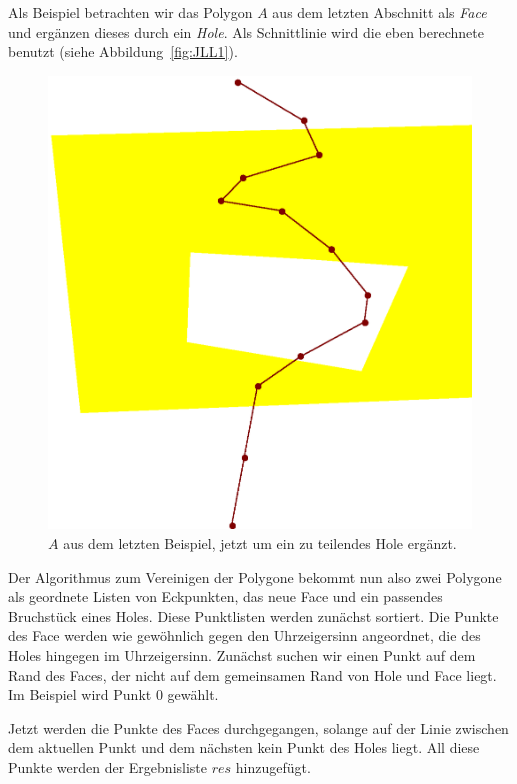 Als Beispiel betrachten wir das Polygon $A$ aus dem letzten Abschnitt als \textit{Face} und ergänzen dieses durch ein \textit{Hole}. Als Schnittlinie wird die eben berechnete benutzt (siehe Abbildung~\vref{fig:JLL1}).

\begin{figure}
	\centering
	\includegraphics[scale=0.6]{JLL1.svg.eps}
	\caption[Ein Face mit einem Hole wird geteilt]{$A$ aus dem letzten Beispiel, jetzt um ein zu teilendes Hole ergänzt.}
	\label{fig:JLL1}
\end{figure}

Der Algorithmus zum Vereinigen der Polygone bekommt nun also zwei Polygone als geordnete Listen von Eckpunkten, das neue Face und ein passendes Bruchstück eines Holes. Diese Punktlisten werden zunächst sortiert. Die Punkte des Face werden wie gewöhnlich gegen den Uhrzeigersinn  angeordnet, die des Holes hingegen im Uhrzeigersinn. Zunächst suchen wir einen Punkt auf dem Rand des Faces, der nicht auf dem gemeinsamen Rand von Hole und Face liegt. Im Beispiel wird Punkt 0 gewählt.

Jetzt werden die Punkte des Faces durchgegangen, solange auf der Linie zwischen dem aktuellen Punkt und dem nächsten kein Punkt des Holes liegt. All diese Punkte werden der Ergebnisliste $res$ hinzugefügt.

